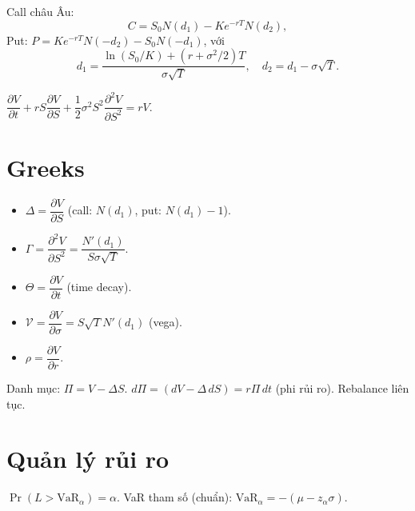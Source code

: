 \documentclass[12pt,a4paper]{article}
\begin{document}
\begin{dinhly}[title={Công thức Black--Scholes}]
  Call châu Âu:
  \[
    C = S_0 N(d_1) - Ke^{-rT}N(d_2),
  \]
  Put: $P = Ke^{-rT}N(-d_2) - S_0 N(-d_1)$, với
  \[
    d_1 = \frac{\ln(S_0/K) + (r + \sigma^2/2)T}{\sigma\sqrt{T}}, \quad d_2 = d_1 - \sigma\sqrt{T}.
  \]
\end{dinhly}

\begin{dinhnghia}[title={PDE Black--Scholes}]
  $\dfrac{\partial V}{\partial t} + rS\dfrac{\partial V}{\partial S} + \dfrac{1}{2}\sigma^2 S^2\dfrac{\partial^2 V}{\partial S^2} = rV$.
\end{dinhnghia}

\section{Greeks}

\begin{congthuc}[title={Các chỉ số Greeks}]
  \begin{itemize}
    \item $\Delta = \dfrac{\partial V}{\partial S}$ (call: $N(d_1)$, put: $N(d_1) - 1$).
    \item $\Gamma = \dfrac{\partial^2 V}{\partial S^2} = \dfrac{N'(d_1)}{S\sigma\sqrt{T}}$.
    \item $\Theta = \dfrac{\partial V}{\partial t}$ (time decay).
    \item $\mathcal{V} = \dfrac{\partial V}{\partial \sigma} = S\sqrt{T}N'(d_1)$ (vega).
    \item $\rho = \dfrac{\partial V}{\partial r}$.
  \end{itemize}
\end{congthuc}

\begin{phuongphap}[title={Delta hedging}]
  Danh mục: $\Pi = V - \Delta S$. $d\Pi = (dV - \Delta\,dS) = r\Pi\,dt$ (phi rủi ro). Rebalance liên tục.
\end{phuongphap}

\section{Quản lý rủi ro}

\begin{dinhnghia}[title={Value at Risk (VaR)}]
  $\Pr(L > \text{VaR}_\alpha) = \alpha$. VaR tham số (chuẩn): $\text{VaR}_\alpha = -(\mu - z_\alpha\sigma)$.
\end{dinhnghia}
\end{document}
